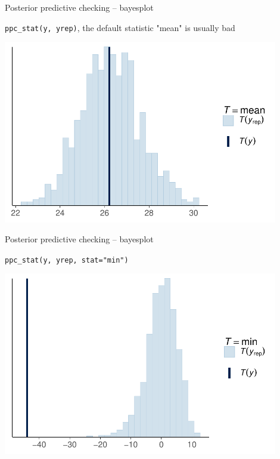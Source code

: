 \documentclass[t]{beamer}
\begin{document}
\begin{frame}{Posterior predictive checking -- bayesplot}

  \vspace{-1\baselineskip}
  \texttt{ppc\_stat(y, yrep)}, the default statistic "mean" is usually bad
  
  \includegraphics[height=8cm]{Newcomb_ppc_stat_mean.pdf}

\end{frame}

\begin{frame}{Posterior predictive checking -- bayesplot}

  \vspace{-1\baselineskip}
  \texttt{ppc\_stat(y, yrep, stat="min")}
  
  \includegraphics[height=8cm]{Newcomb_ppc_stat_min.pdf}

\end{frame}
\end{document}
